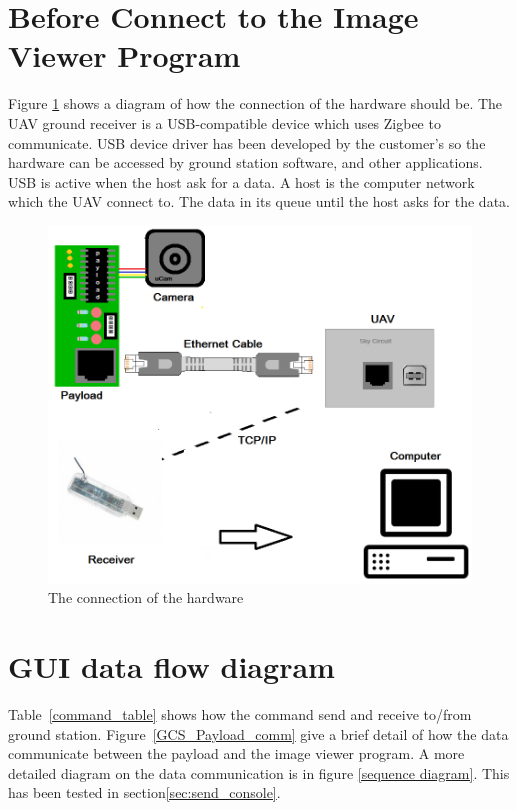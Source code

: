 \section{Before Connect to the Image Viewer Program}
Figure \ref{schemetic_clipA} shows a diagram of how the connection of the hardware should be. 
The UAV ground receiver is a USB-compatible device which uses Zigbee to communicate. 
USB device driver has been developed by the customer’s so the hardware can be accessed by ground station software, and other applications. 
USB is active when the host ask for a data. 
A host is the computer network which the UAV connect to. 
The data in its queue until the host asks for the data. 
\begin{figure}[!hbtp]
\begin{center}
\includegraphics[scale=0.4]{figures/clipArt.png} 
\end{center}
\caption{The connection of the hardware\label{schemetic_clipA}}
\end{figure}


\section{GUI data flow diagram}

Table~\ref{command_table} shows how the command send and receive to/from ground station.  Figure~\ref{GCS_Payload_comm} give a brief detail of how the data communicate between the payload and the image viewer program. 
A more detailed diagram on the data communication is in figure \ref{sequence diagram}.
This has been tested in section\ref{sec:send_console}.

